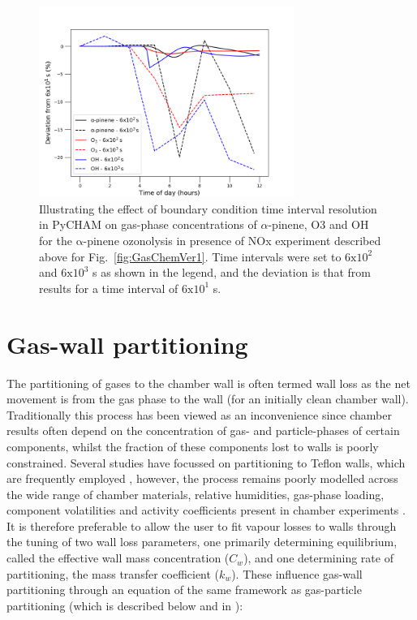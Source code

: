 \documentclass[gmd, manuscript]{copernicus}
\begin{document}
\begin{figure}[t]
\includegraphics[width=8.3cm]{Results/photo_chem_time_res.png}
\caption{Illustrating the effect of boundary condition time interval resolution in PyCHAM on gas-phase concentrations of $\alpha$-pinene, O3 and OH for the $\mathrm{\alpha}$-pinene ozonolysis in presence of NOx experiment described above for Fig.~\ref{fig:GasChemVer1}.  Time intervals were set to $\mathrm{6x10^2}$ and $\mathrm{6x10^3}$ s as shown in the legend, and the deviation is that from results for a time interval of $\mathrm{6x10^1}$ s.}
\label{fig:GasChemTimeRes}
\end{figure}

\section{Gas-wall partitioning}\label{sec:wallpart}

The partitioning of gases to the chamber wall is often termed wall loss as the net movement is from the gas phase to the wall (for an initially clean chamber wall).  Traditionally this process has been viewed as an inconvenience since chamber results often depend on the concentration of gas- and particle-phases of certain components, whilst the fraction of these components lost to walls is poorly constrained.  Several studies have focussed on partitioning to Teflon walls, which are frequently employed \citep{Matsunaga2010, Zhang2015b, Zhao2018}, however, the process remains poorly modelled across the wide range of chamber materials, relative humidities, gas-phase loading, component volatilities and activity coefficients present in chamber experiments \citep[e.g.][]{Day2017, Stefenelli2018}.  It is therefore preferable to allow the user to fit vapour losses to walls through the tuning of two wall loss parameters, one primarily determining equilibrium, called the effective wall mass concentration ($C_w$), and one determining rate of partitioning, the mass transfer coefficient ($k_w$).  These influence gas-wall partitioning through an equation of the same framework as gas-particle partitioning (which is described below and in \citet{Zaveri2008}):
\end{document}
